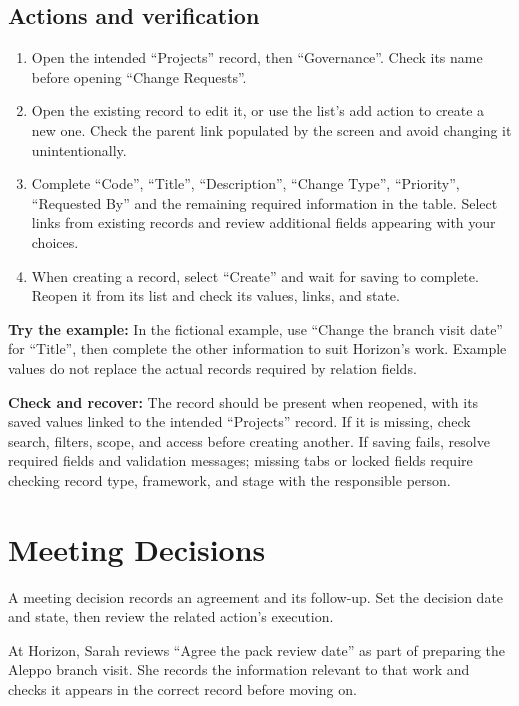 \subsection{Actions and verification}
\begin{enumerate}
\item Open the intended “Projects” record, then “Governance”. Check its name before opening “Change Requests”.
\item Open the existing record to edit it, or use the list's add action to create a new one. Check the parent link populated by the screen and avoid changing it unintentionally.
\item Complete “Code”, “Title”, “Description”, “Change Type”, “Priority”, “Requested By” and the remaining required information in the table. Select links from existing records and review additional fields appearing with your choices.
\item When creating a record, select “Create” and wait for saving to complete. Reopen it from its list and check its values, links, and state.
\end{enumerate}

\textbf{Try the example:} In the fictional example, use “Change the branch visit date” for “Title”, then complete the other information to suit Horizon's work. Example values do not replace the actual records required by relation fields.

\textbf{Check and recover:} The record should be present when reopened, with its saved values linked to the intended “Projects” record. If it is missing, check search, filters, scope, and access before creating another. If saving fails, resolve required fields and validation messages; missing tabs or locked fields require checking record type, framework, and stage with the responsible person.

\clearpage
\section{Meeting Decisions}
\label{sec:projects-feature-meeting-decisions}

A meeting decision records an agreement and its follow-up. Set the decision date and state, then review the related action's execution.

\begin{rcnote}
At Horizon, Sarah reviews “Agree the pack review date” as part of preparing the Aleppo branch visit. She records the information relevant to that work and checks it appears in the correct record before moving on.
\end{rcnote}

